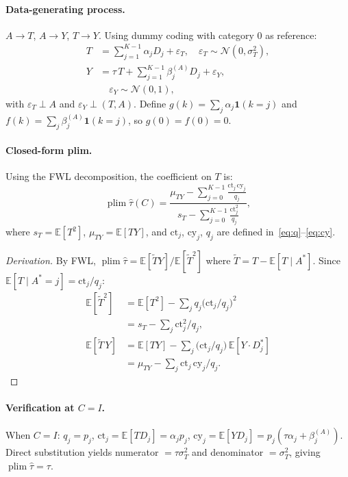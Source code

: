 \paragraph{Data-generating process.}
$A\to T$, $A\to Y$, $T\to Y$.
Using dummy coding with category 0 as reference:
\begin{align*}
  T &= \textstyle\sum_{j=1}^{K-1}\alpha_j D_j + \varepsilon_T,\quad
  \varepsilon_T\sim\mathcal{N}(0,\sigma_T^2),\\
  Y &= \tau\, T + \textstyle\sum_{j=1}^{K-1}\beta_j^{(A)} D_j + \varepsilon_Y,\\
  &\quad \varepsilon_Y\sim\mathcal{N}(0,1),
\end{align*}
with $\varepsilon_T\perp A$ and $\varepsilon_Y\perp(T,A)$.
Define $g(k)=\sum_{j}\alpha_j\mathbf{1}(k{=}j)$ and
$f(k)=\sum_{j}\beta_j^{(A)}\mathbf{1}(k{=}j)$, so $g(0)=f(0)=0$.

\paragraph{Closed-form plim.}
Using the FWL decomposition, the coefficient on $T$ is:
\begin{equation}
  \operatorname{plim}\hat\tau(C)
  = \frac{\mu_{TY} - \sum_{j=0}^{K-1}\frac{\mathrm{ct}_j\,\mathrm{cy}_j}{q_j}}
  {s_T - \sum_{j=0}^{K-1}\frac{\mathrm{ct}_j^2}{q_j}},
  \label{eq:plim_conf}
\end{equation}
where $s_T=\mathbb{E}[T^2]$, $\mu_{TY}=\mathbb{E}[TY]$, and $\mathrm{ct}_j$, $\mathrm{cy}_j$, $q_j$ are defined in~\eqref{eq:q}--\eqref{eq:cy}.

\begin{proof}[Derivation]
By FWL, $\operatorname{plim}\hat\tau = \mathbb{E}[\tilde{T}Y]/\mathbb{E}[\tilde{T}^2]$ where $\tilde{T}=T-\mathbb{E}[T\mid A^*]$.
Since $\mathbb{E}[T\mid A^*{=}j]=\mathrm{ct}_j/q_j$:
\begin{align*}
  \mathbb{E}[\tilde{T}^2]
  &= \mathbb{E}[T^2] - \textstyle\sum_j q_j\bigl(\mathrm{ct}_j/q_j\bigr)^2\\
  &= s_T - \textstyle\sum_j \mathrm{ct}_j^2/q_j,\\
  \mathbb{E}[\tilde{T}\,Y]
  &= \mathbb{E}[TY] - \textstyle\sum_j \bigl(\mathrm{ct}_j/q_j\bigr)\,\mathbb{E}[Y\cdot D_j^*]\\
  &= \mu_{TY} - \textstyle\sum_j \mathrm{ct}_j\,\mathrm{cy}_j/q_j.
\end{align*}
\end{proof}

\paragraph{Verification at $C=I$.}
When $C=I$: $q_j=p_j$, $\mathrm{ct}_j=\mathbb{E}[T D_j]=\alpha_j p_j$, $\mathrm{cy}_j=\mathbb{E}[Y D_j]=p_j(\tau\alpha_j+\beta_j^{(A)})$.
Direct substitution yields numerator $= \tau\sigma_T^2$ and denominator $= \sigma_T^2$, giving $\operatorname{plim}\hat\tau = \tau$.


